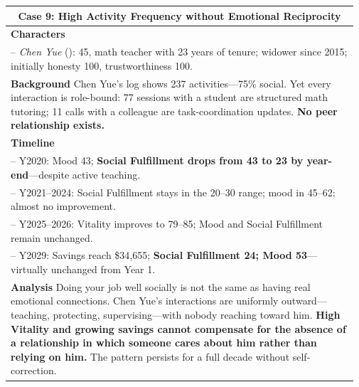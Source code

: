 \begin{table}[htbp]
\begin{tabular}{p{0.97\linewidth}}
\multicolumn{1}{c}{\textbf{Case 9: High Activity Frequency without Emotional Reciprocity}}\\
\midrule
\textbf{Characters}\\
\quad -- \textit{Chen Yue} (\campus{}): 45, math teacher with 23 years of tenure;
  widower since 2015; initially honesty 100, trustworthiness 100.\\[2pt]
\textbf{Background}\quad
Chen Yue's log shows 237 activities---75\% social.
Yet every interaction is role-bound:
77 sessions with a student are structured math tutoring;
11 calls with a colleague are task-coordination updates.
\textbf{No peer relationship exists.}\\[2pt]
\textbf{Timeline}\\
\quad -- Y2020: Mood 43;
  \textbf{Social Fulfillment drops from 43 to 23 by year-end}---despite active teaching.\\
\quad -- Y2021--2024: Social Fulfillment stays in the 20--30 range;
  mood in 45--62; almost no improvement.\\
\quad -- Y2025--2026: Vitality improves to 79--85;
  Mood and Social Fulfillment remain unchanged.\\
\quad -- Y2029: Savings reach \$34,655;
  \textbf{Social Fulfillment 24; Mood 53}---virtually unchanged from Year 1.\\[2pt]
\textbf{Analysis}\quad
Doing your job well socially is not the same as having real emotional connections.
Chen Yue's interactions are uniformly outward---teaching, protecting,
supervising---with nobody reaching toward him.
\textbf{High Vitality and growing savings cannot compensate for the absence
of a relationship in which someone cares about him rather than relying on him.}
The pattern persists for a full decade without self-correction.\\

\bottomrule
\end{tabular}
\end{table}


